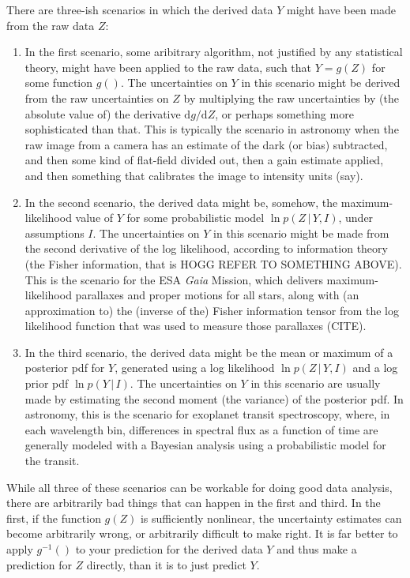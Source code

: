 \documentclass{article}
\newcommand{\dd}{\mathrm{d}}
\newcommand{\given}{\,|\,}
\begin{document}
There are three-ish scenarios in which the derived data $Y$ might have been made from the raw data $Z$:
\begin{enumerate}
\item In the first scenario, some aribitrary algorithm, not justified by any statistical theory, might have been applied to the raw data, such that $Y=g(Z)$ for some function $g()$.
The uncertainties on $Y$ in this scenario might be derived from the raw uncertainties on $Z$  by multiplying the raw uncertainties by (the absolute value of) the derivative $\dd g/\dd Z$, or perhaps something more sophisticated than that.
This is typically the scenario in astronomy when the raw image from a camera has an estimate of the dark (or bias) subtracted, and then some kind of flat-field divided out, then a gain estimate applied, and then something that calibrates the image to intensity units (say).
\item In the second scenario, the derived data might be, somehow, the maximum-likelihood value of $Y$ for some probabilistic model $\ln p(Z\given Y,I)$, under assumptions $I$.
The uncertainties on $Y$ in this scenario might be made from the second derivative of the log likelihood, according to information theory (the Fisher information, that is HOGG REFER TO SOMETHING ABOVE).
This is the scenario for the ESA \textsl{Gaia} Mission, which delivers maximum-likelihood parallaxes and proper motions for all stars, along with (an approximation to) the (inverse of the) Fisher information tensor from the log likelihood function that was used to measure those parallaxes (CITE).
\item In the third scenario, the derived data might be the mean or maximum of a posterior pdf for $Y$, generated using a log likelihood $\ln p(Z\given Y,I)$ and a log prior pdf $\ln p(Y\given I)$.
The uncertainties on $Y$ in this scenario are usually made by estimating the second moment (the variance) of the posterior pdf.
In astronomy, this is the scenario for exoplanet transit spectroscopy, where, in each wavelength bin, differences in spectral flux as a function of time are generally modeled with a Bayesian analysis using a probabilistic model for the transit.
\end{enumerate}
While all three of these scenarios can be workable for doing good data analysis, there are arbitrarily bad things that can happen in the first and third.
In the first, if the function $g(Z)$ is sufficiently nonlinear, the uncertainty estimates can become arbitrarily wrong, or arbitrarily difficult to make right.
It is far better to apply $g^{-1}()$ to your prediction for the derived data $Y$ and thus make a prediction for $Z$ directly, than it is to just predict $Y$.
\end{document}
